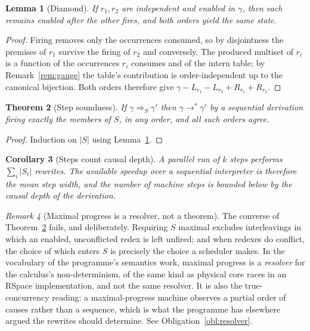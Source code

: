 \documentclass[11pt,a4paper]{article}
\theoremstyle{plain}
\newtheorem{theorem}{Theorem}[section]
\newtheorem{lemma}[theorem]{Lemma}
\newtheorem{corollary}[theorem]{Corollary}
\theoremstyle{definition}
\theoremstyle{remark}
\newtheorem{remark}[theorem]{Remark}
\newcommand{\wred}{\longrightarrow^{*}}
\begin{document}
\begin{lemma}[Diamond]
\label{lem:diamond}
If $r_1, r_2$ are independent and enabled in $\gamma$, then each remains
enabled after the other fires, and both orders yield the same state.
\end{lemma}

\begin{proof}
Firing removes only the occurrences consumed, so by disjointness the premises
of $r_1$ survive the firing of $r_2$ and conversely. The produced multiset of
$r_i$ is a function of the occurrences $r_i$ consumes and of the intern table;
by Remark~\ref{rem:gauge} the table's contribution is order-independent up to
the canonical bijection. Both orders therefore give
$\gamma - L_{r_1} - L_{r_2} + R_{r_1} + R_{r_2}$.
\end{proof}

\begin{theorem}[Step soundness]
\label{thm:sound}
If $\gamma \Rightarrow_S \gamma'$ then $\gamma \wred \gamma'$ by a sequential
derivation firing exactly the members of $S$, in any order, and all such
orders agree.
\end{theorem}

\begin{proof}
Induction on $|S|$ using Lemma~\ref{lem:diamond}.
\end{proof}

\begin{corollary}[Steps count causal depth]
\label{cor:depth}
A parallel run of $k$ steps performs $\sum_i |S_i|$ rewrites. The available
speedup over a sequential interpreter is therefore the mean step width, and
the number of machine steps is bounded below by the causal depth of the
derivation.
\end{corollary}

\begin{remark}[Maximal progress is a resolver, not a theorem]
\label{rem:resolver}
The converse of Theorem~\ref{thm:sound} fails, and deliberately. Requiring
$S$ maximal excludes interleavings in which an enabled, unconflicted redex
is left unfired; and when redexes do conflict, the choice of which enters $S$
is precisely the choice a scheduler makes. In the vocabulary of the
programme's semantics work, maximal progress is a \emph{resolver} for the
calculus's non-determinism, of the same kind as physical core races in an
RSpace implementation, and not the same resolver. It is also the true-concurrency
reading: a maximal-progress machine observes a partial order of causes rather
than a sequence, which is what the programme has elsewhere argued the
rewrites should determine. See Obligation~\ref{obl:resolver}.
\end{remark}
\end{document}

